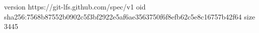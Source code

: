 version https://git-lfs.github.com/spec/v1
oid sha256:7568b87552b0902c5f3bf2922e5af6ae3563750f6f8efb62c5e8c16757b42f64
size 3445
